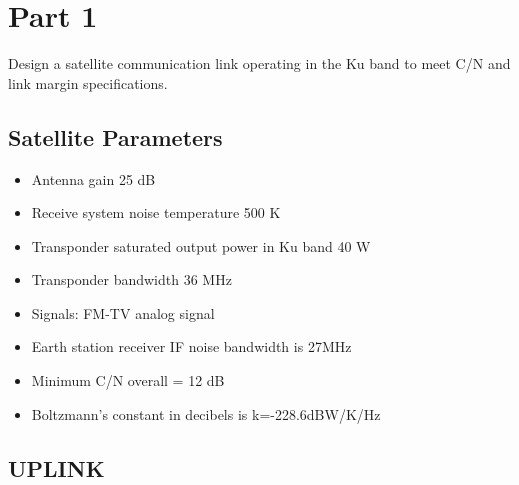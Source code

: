 \documentclass[11pt]{article}
\begin{document}


\pagebreak


\tableofcontents
\pagebreak


\section{Part 1}\label{part1}

Design a satellite communication link operating in the Ku band to meet C/N and link margin specifications.


\subsection{Satellite Parameters}\label{Satellite Parameters}

\begin{itemize}
    \item Antenna gain 25 dB
    \item Receive system noise temperature 500 K
    \item Transponder saturated output power in Ku band 40 W
    \item Transponder bandwidth 36 MHz
    \item Signals: FM-TV analog signal
    \item Earth station receiver IF noise bandwidth is 27MHz
    \item Minimum C/N overall = 12 dB
    \item Boltzmann’s constant in decibels is k=-228.6dBW/K/Hz
\end{itemize} 

\subsection{UPLINK}\label{UPLINK}
\end{document}
